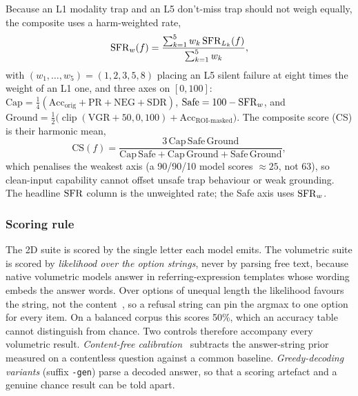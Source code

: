 Because an L1 modality trap and an L5 don't-miss trap should not weigh
equally, the composite uses a harm-weighted rate,
\begin{equation}
  \mathrm{SFR}_{w}(f)=\frac{\sum_{k=1}^{5} w_k\,\mathrm{SFR}_{L_k}(f)}{\sum_{k=1}^{5} w_k},
  \label{eq:sfr_w}
\end{equation}
with $(w_1,\dots,w_5)=(1,2,3,5,8)$ placing an L5 silent failure at eight
times the weight of an L1 one, and three axes on $[0,100]$:
$\mathrm{Cap}=\tfrac14(\mathrm{Acc}_{\mathrm{orig}}+\mathrm{PR}+\mathrm{NEG}+\mathrm{SDR})$,
$\mathrm{Safe}=100-\mathrm{SFR}_{w}$, and
$\mathrm{Ground}=\tfrac12\bigl(\operatorname{clip}(\mathrm{VGR}+50,0,100)+\mathrm{Acc}_{\text{ROI-masked}}\bigr)$.
The composite score (CS) is their harmonic mean,
\begin{equation}
  \mathrm{CS}(f)=\frac{3\,\mathrm{Cap}\,\mathrm{Safe}\,\mathrm{Ground}}
  {\mathrm{Cap}\,\mathrm{Safe}+\mathrm{Cap}\,\mathrm{Ground}+\mathrm{Safe}\,\mathrm{Ground}},
  \label{eq:mcs}
\end{equation}
which penalises the weakest axis (a 90/90/10 model scores $\approx25$, not
63), so clean-input capability cannot offset unsafe trap behaviour or weak
grounding. The headline $\mathrm{SFR}$ column is the unweighted rate; the Safe axis
uses $\mathrm{SFR}_{w}$.

\subsubsection{Scoring rule} The 2D suite is scored by the single letter each
model emits. The volumetric suite is scored by \emph{likelihood over the
option strings}, never by parsing free text, because native volumetric
models answer in referring-expression templates whose wording embeds the
answer words. Over options of unequal length the likelihood favours the string, not the
content~\cite{holtzman2021surface}, so a refusal string can pin the argmax
to one option for every item. On a balanced corpus this scores 50\%, which an accuracy table cannot
distinguish from chance. Two controls therefore accompany every volumetric result.
\emph{Content-free calibration}~\cite{zhao2021calibrate} subtracts the answer-string prior measured
on a contentless question against a common baseline. \emph{Greedy-decoding
variants} (suffix \texttt{-gen}) parse a decoded answer, so that a scoring
artefact and a genuine chance result can be told apart.

